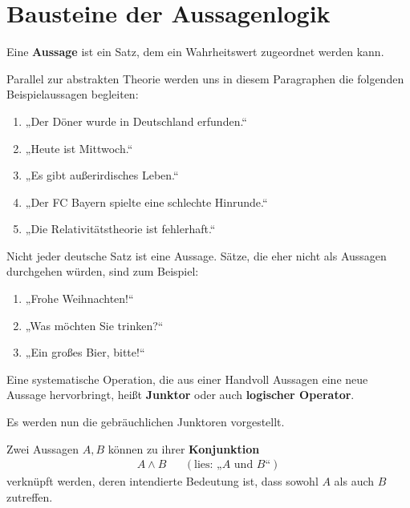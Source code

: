 \section{Bausteine der Aussagenlogik} \label{section:aussagenlogik}


\begin{defin}[Aussage] \label{def:aussage}
    Eine \textbf{Aussage} ist ein Satz, dem ein Wahrheitswert zugeordnet werden kann.
\end{defin}
	

\begin{bsp}
    Parallel zur abstrakten Theorie werden uns in diesem Paragraphen die folgenden Beispielaussagen begleiten:
    \begin{enumerate}[label={$B_{\arabic*}:=$}, labelindent=1.5em, leftmargin=*, series=propbsp]
        \item „Der Döner wurde in Deutschland erfunden.“
        \item „Heute ist Mittwoch.“
        \item „Es gibt außerirdisches Leben.“
        \item „Der FC Bayern spielte eine schlechte Hinrunde.“
        \item „Die Relativitätstheorie ist fehlerhaft.“
    \end{enumerate}
    Nicht jeder deutsche Satz ist eine Aussage. Sätze, die eher nicht als Aussagen durchgehen würden, sind zum Beispiel: \quad
    \begin{enumerate}[resume*]
        \item[] „Frohe Weihnachten!“
        \item[] „Was möchten Sie trinken?“
        \item[] „Ein großes Bier, bitte!“
    \end{enumerate}
\end{bsp}


\begin{defin}[Junktor] 
    Eine systematische Operation, die aus einer Handvoll Aussagen eine neue Aussage hervorbringt, heißt \textbf{Junktor} oder auch \textbf{logischer Operator}.
\end{defin}


Es werden nun die gebräuchlichen Junktoren vorgestellt.


\begin{defin} 
    Zwei Aussagen $A,B$ können zu ihrer \textbf{Konjunktion}
    \begin{align*}
        A\land B && (\text{lies: „$A$ und $B$“})
    \end{align*}
    verknüpft werden, deren intendierte Bedeutung ist, dass sowohl $A$ als auch $B$ zutreffen.
\end{defin}


